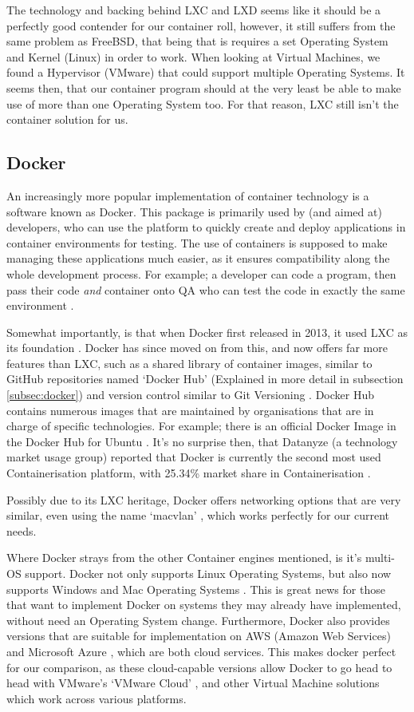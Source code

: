 The technology and backing behind LXC and LXD seems like it should be a perfectly good contender for our container roll, however, it still suffers from the same problem as FreeBSD, that being that is requires a set Operating System and Kernel (Linux) in order to work. When looking at Virtual Machines, we found a Hypervisor (VMware) that could support multiple Operating Systems. It seems then, that our container program should at the very least be able to make use of more than one Operating System too. For that reason, LXC still isn't the container solution for us.

\subsection{Docker}
An increasingly more popular implementation of container technology is a software known as Docker. This package is primarily used by (and aimed at) developers, who can use the platform to quickly create and deploy applications in container environments for testing. The use of containers is supposed to make managing these applications much easier, as it ensures compatibility along the whole development process. For example; a developer can code a program, then pass their code \emph{and} container onto QA who can test the code in exactly the same environment \citep{whydocker}.

Somewhat importantly, is that when Docker first released in 2013, it used LXC as its foundation \citep{ContainerHistory}. Docker has since moved on from this, and now offers far more features than LXC, such as a shared library of container images, similar to GitHub repositories named `Docker Hub' (Explained in more detail in subsection \ref{subsec:docker}) and version control similar to Git Versioning \citep{DockerBetter}. Docker Hub contains numerous images that are maintained by organisations that are in charge of specific technologies. For example; there is an official Docker Image in the Docker Hub for Ubuntu \citep{UbuntuDockerHub}. It's no surprise then, that Datanyze (a technology market usage group) reported that Docker is currently the second most used Containerisation platform, with 25.34\% market share in Containerisation \citep{datanyze}.

Possibly due to its LXC heritage, Docker offers networking options that are very similar, even using the name `macvlan' \citep{DockerMacVlan}, which works perfectly for our current needs.

Where Docker strays from the other Container engines mentioned, is it's multi-OS support. Docker not only supports Linux Operating Systems, but also now supports Windows and Mac Operating Systems \citep{DockerEditions}. This is great news for those that want to implement Docker on systems they may already have implemented, without need an Operating System change. Furthermore, Docker also provides versions that are suitable for implementation on AWS (Amazon Web Services) and Microsoft Azure \citep{DockerEditions}, which are both cloud services. This makes docker perfect for our comparison, as these cloud-capable versions allow Docker to go head to head with VMware's `VMware Cloud' \citep{VMwareCloud}, and other Virtual Machine solutions which work across various platforms.

